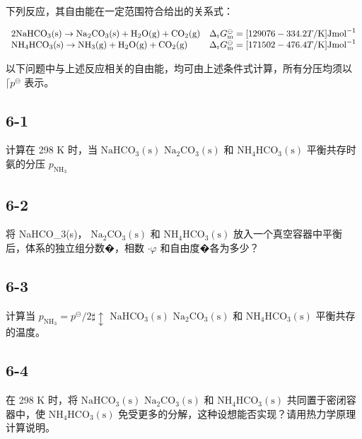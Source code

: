 下列反应，其⾃由能在⼀定范围符合给出的关系式：

$
\begin{array}{l l}2 \mathrm{NaHCO} _ {3} (\mathrm{s}) \rightarrow \mathrm{Na} _ {2} \mathrm{CO} _ {3} (\mathrm{s}) + \mathrm{H} _ {2} \mathrm{O} (\mathrm{g}) + \mathrm{CO} _ {2} (\mathrm{g})&\Delta_ {\mathrm{r}} G _ {\mathrm{m}} ^ {\ominus} = [ 1 2 9 0 7 6 - 3 3 4. 2 T / \mathrm{K} ] \mathrm{Jmol} ^ {- 1}\\\mathrm{NH} _ {4} \mathrm{HCO} _ {3} (\mathrm{s}) \rightarrow \mathrm{NH} _ {3} (\mathrm{g}) + \mathrm{H} _ {2} \mathrm{O} (\mathrm{g}) + \mathrm{CO} _ {2} (\mathrm{g})&\Delta_ {\mathrm{r}} G _ {\mathrm{m}} ^ {\ominus} = [ 1 7 1 5 0 2 - 4 7 6. 4 T / \mathrm{K} ] \mathrm{Jmol} ^ {- 1}\end{array}
$

以下问题中与上述反应相关的⾃由能，均可由上述条件式计算，所有分压均须以 $\lceil p ^ { \ominus }$ 表⽰。

\subsection*{6-1}
计算在 298 K 时，当 $\mathrm { { N a H C O _ { 3 } ( s ) } }$ $\mathrm { N a _ { 2 } C O _ { 3 } ( s ) }$ 和 $\mathrm { N H _ { 4 } H C O _ { 3 } ( s ) }$ 平衡共存时氨的分压 $p _ { \mathrm { N H } _ { 3 } }$

\subsection*{6-2}
将 NaHCO_{3}(s)， $\mathrm { N a _ { 2 } C O _ { 3 } ( s ) }$ 和 $\mathrm { N H _ { 4 } H C O _ { 3 } ( s ) }$ 放⼊⼀个真空容器中平衡后，体系的独⽴组分数�，相数 $\scriptstyle \cdot \varphi$ 和⾃由度�各为多少？

\subsection*{6-3}
计算当 $p _ { \mathrm { N H } _ { 3 } } = p ^ { \ominus } / 2 \sharp \updownarrow$ $\mathrm { { N a H C O _ { 3 } ( s ) } }$ $\mathrm { N a _ { 2 } C O _ { 3 } ( s ) }$ 和 $\mathrm { N H _ { 4 } H C O _ { 3 } ( s ) }$ 平衡共存的温度。

\subsection*{6-4}
在 298 K 时，将 $\mathrm { { N a H C O _ { 3 } ( s ) } }$ $\mathrm { N a _ { 2 } C O _ { 3 } ( s ) }$ 和 $\mathrm { N H _ { 4 } H C O _ { 3 } ( s ) }$ 共同置于密闭容器中，使 $\mathrm { N H _ { 4 } H C O _ { 3 } ( s ) }$ 免受更多的分解，这种设想能否实现？请⽤热⼒学原理计算说明。

